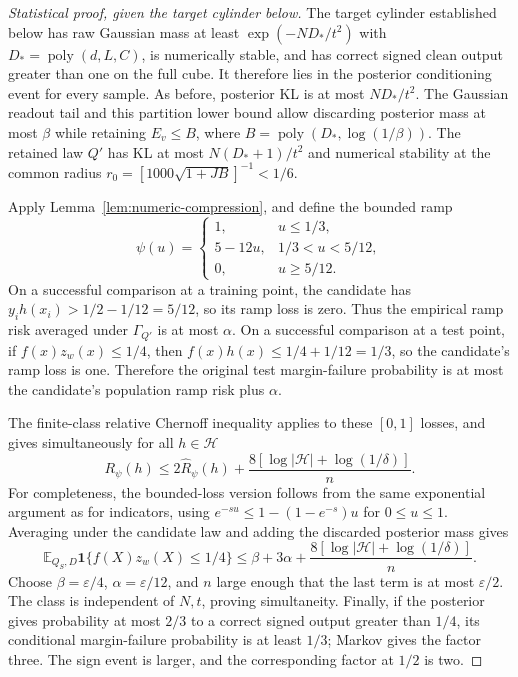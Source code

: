 \begin{proof}[Statistical proof, given the target cylinder below]
The target cylinder established below has raw Gaussian mass at least
$\exp(-ND_*/t^2)$ with $D_*=\operatorname{poly}(d,L,C)$, is numerically
stable, and has correct signed clean output greater than one on the full
cube. It therefore lies in the posterior conditioning event for every
sample. As before, posterior KL is at most $ND_*/t^2$.
The Gaussian readout tail and this partition lower bound allow discarding
posterior mass at most $\beta$ while retaining $E_v\le B$, where
$B=\operatorname{poly}(D_*,\log(1/\beta))$.
The retained law $Q'$ has KL at most $N(D_*+1)/t^2$ and numerical stability
at the common radius
$r_0=[1000\sqrt{1+JB}]^{-1}<1/6$.

Apply Lemma~\ref{lem:numeric-compression}, and define the bounded ramp
\[
 \psi(u)=
 \begin{cases}
 1,&u\le1/3,\\
 5-12u,&1/3<u<5/12,\\
 0,&u\ge5/12.
 \end{cases}
\]
On a successful comparison at a training point, the candidate has
$y_i h(x_i)>1/2-1/12=5/12$, so its ramp loss is zero. Thus the empirical
ramp risk averaged under $\Gamma_{Q'}$ is at most $\alpha$.
On a successful comparison at a test point, if $f(x)z_w(x)\le1/4$, then
$f(x)h(x)\le1/4+1/12=1/3$, so the candidate's ramp loss is one.
Therefore the original test margin-failure probability is at most the
candidate's population ramp risk plus $\alpha$.

The finite-class relative Chernoff inequality applies to these $[0,1]$
losses, and gives simultaneously for all $h\in\mathcal H$
\[
 R_\psi(h)\le2\widehat R_\psi(h)
             +\frac{8[\log|\mathcal H|+\log(1/\delta)]}{n}.
\]
For completeness, the bounded-loss version follows from the same
exponential argument as for indicators, using
$e^{-s u}\le1-(1-e^{-s})u$ for $0\le u\le1$.
Averaging under the candidate law and adding the discarded posterior mass
gives
\[
 \mathbb E_{Q_S,D}\mathbf1\{f(X)z_w(X)\le1/4\}
 \le\beta+3\alpha+
       \frac{8[\log|\mathcal H|+\log(1/\delta)]}{n}.
\]
Choose $\beta=\varepsilon/4$, $\alpha=\varepsilon/12$, and $n$ large enough
that the last term is at most $\varepsilon/2$.
The class is independent of $N,t$, proving simultaneity.
Finally, if the posterior gives probability at most $2/3$ to a correct
signed output greater than $1/4$, its conditional margin-failure probability
is at least $1/3$; Markov gives the factor three. The sign event is larger,
and the corresponding factor at $1/2$ is two.
\end{proof}

